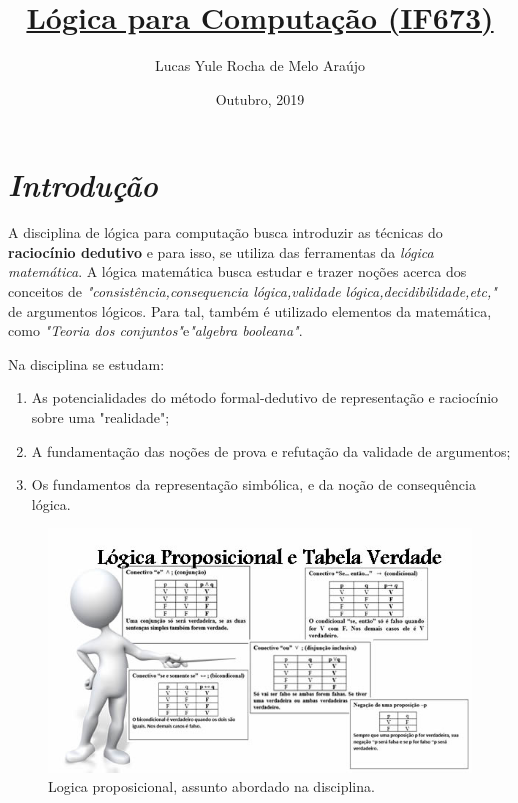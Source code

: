 \documentclass{article}
\title{\textbf{\underline{Lógica para Computação (IF673)}}}
\author{Lucas Yule Rocha de Melo Araújo}
\date{Outubro, 2019}
\begin{document}
\maketitle

\section{\emph{Introdução}}
    A disciplina de lógica para computação busca introduzir as técnicas do \textbf{raciocínio dedutivo} e para isso, se utiliza das ferramentas da \emph{lógica matemática}. A lógica matemática busca estudar e trazer noções acerca dos conceitos de \emph{"consistência,consequencia lógica,validade lógica,decidibilidade,etc,"} de argumentos lógicos. Para tal, também é utilizado elementos da matemática, como \emph{"Teoria dos conjuntos"}e\emph{"algebra booleana"}.\cite{pgDisciplina}

    Na disciplina se estudam:
    \begin{enumerate}
        \item As potencialidades do método formal-dedutivo de representação e raciocínio sobre uma "realidade";
        \item A fundamentação das noções de prova e refutação da validade de argumentos;
        \item Os fundamentos da representação simbólica, e da noção de consequência lógica.
    \end{enumerate}
    
\begin{figure}[h!]
    \centering
    \includegraphics[scale=0.6]{logica.jpeg}
    \caption{Logica proposicional, assunto abordado na disciplina.\cite{imgLogica}}
    \label{fig:my_label}
\end{figure}
\end{document}
